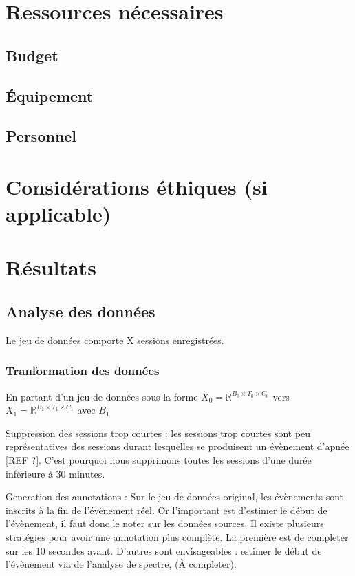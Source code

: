 \documentclass{article}
\begin{document}
    \section{Ressources nécessaires}
    \subsection{Budget}
    \subsection{Équipement}
    \subsection{Personnel}
    \section{Considérations éthiques (si applicable)}
    \section{Résultats}

    \subsection{Analyse des données}

    Le jeu de données comporte X sessions enregistrées.

    \subsubsection{Tranformation des données}

    En partant d'un jeu de données sous la forme $X_0 = \mathbb{R}^{B_0 \times T_0 \times C_0}$ vers $X_1 = \mathbb{R}^{B_1 \times T_1 \times C_1}$ avec $B_1$

    Suppression des sessions trop courtes : les sessions trop courtes sont peu représentatives des sessions durant lesquelles se produisent un évènement d'apnée [REF ?]. C'est pourquoi nous supprimons toutes les sessions d'une durée inférieure à 30 minutes.

    Generation des annotations : Sur le jeu de données original, les évènements sont inscrits à la fin de l'évènement réel. Or l'important est d'estimer le début de l'évènement, il faut donc le noter sur les données sources. Il existe plusieurs stratégies pour avoir une annotation plus complète. La première est de completer sur les 10 secondes avant. D'autres sont envisageables : estimer le début de l'évènement via de l'analyse de spectre, (À completer).
\end{document}
